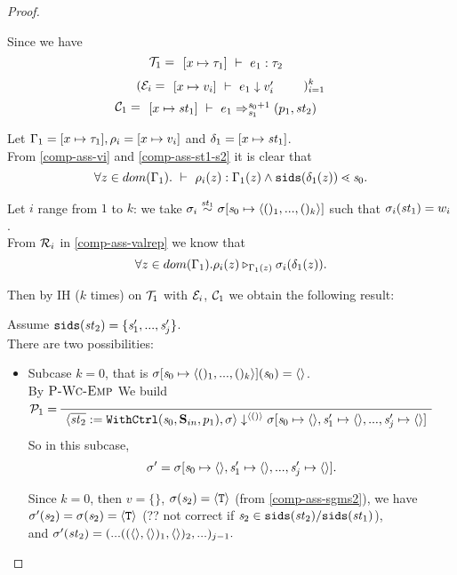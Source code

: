 \begin{proof}
\begin{itemize}
\begin{enumerate}[(i)]
	
	Since we have 
	$$\MT_1 = \PT{\AC{\Type{[x \|-> {\tau_1}]}{e_1}{\tau_2}}}$$
	$$(\ME_i = \PT{\AC{\Eval{[x \|-> {v_i}]}{e_1}{v_i'}}})^k_{i=1} $$
	$$\MC_1 = \PT{\AC{\Trans{[x \|-> {\st_1}]}{e_1}{\s_0+1}{\s_1}{\sfun{p_1}{\st_2}}}}$$
	
	Let $\Gam_1 = [x \|-> \tau_1], \rho_i= [x \|-> v_i]$ and $\del_1 = [x \|-> \st_1]$. \\
	From \eqref{comp-ass-vi} and \eqref{comp-ass-st1-s2} it is clear that 
	$$\forall z \in dom(\Gam_1). \Type{}{\rho_i(z)}{\Gam_1(z)} \wedge 
	\sids{\del_1(z)} \.< \s_0 .$$
	
	Let $i$ range from $1$ to $k$: we take $\sgm_i \~{\st_1} \sgm[\s_0 \|-> \<()_1,...,()_k \'>]$ 
	such that $\sigma_i(\mathit{st}_1)= w_i$. \\
	From $\mathcal{R}_i$ in \eqref{comp-ass-valrep} we know that  
	$$\forall z \in dom(\Gamma_1). \rho_i(z) \triangleright_{\Gamma_1(z)} \sigma_i(\delta_1(z)).$$
	
	
	Then  by IH ($k$ times) on $\mathcal{T}_1$ with $\mathcal{E}_i$, 
	$\mathcal{C}_1$ we obtain the following result:


	Assume $\mathtt{sids}(\mathit{st}_2) = \{\mathit{s}'_1,...,\mathit{s}'_j\}$.\\
	
	There are two possibilities:
	\begin{itemize}
	\item 
	Subcase $k=0$, that is $\sgmsz(\s_0) = \emptyv$.\\
	By $\textsc{P-Wc-Emp}$ We build
	$$\PT{
		\AC{}
		\LeLa{\MP_1 = }
		\UC{\seval{\withctrl{\s_0}{p_1}{\Sin}{\overline{\st_2}}}{\sgm}{\< () \'>}
			{\sgm[\s_0 \|-> \emptyv, \s_1' \|-> \emptyv, ..., \s_j' \|-> \emptyv]}}
	  }$$ 
    So in this subcase, 
    $$\sgm' = \sgm[\s_0 \|-> \emptyv, \s_1' \|-> \emptyv, ..., \s_j' \|-> \emptyv].$$ 

\def\sgmpempty{\sgm[\s_0 \|-> \emptyv, \s_1' \|-> \emptyv, ..., \s_j' \|-> \emptyv]}

	Since $k=0$, then $v = \{ \}$, $\sigma(\mathit{s}_2) = \langle \mathtt{T} \rangle$ (from \eqref{comp-ass-sgms2}), we have \\
	{\color{red} $\sigma'(\mathit{s}_2) = \sigma(\mathit{s}_2) = \langle \mathtt{T} \rangle$ (?? not correct if $\mathit{s}_2 \in \mathtt{sids}(\mathit{st}_2)/\mathtt{sids}(\mathit{st}_1)$)}, \\
	and $\sigma'(\mathit{st}_2) = (...((\langle \rangle,\langle \rangle)_1,\langle \rangle)_2,...)_{j-1}.$ \\
	

\end{itemize}
\end{enumerate}
\end{itemize}
\end{proof}
